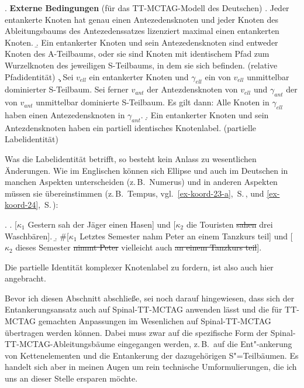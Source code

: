 \ex. {\bf Externe Bedingungen} (für das TT-MCTAG-Modell des Deutschen)
\a. Jeder entankerte Knoten hat genau einen Antezedensknoten und jeder Knoten des Ableitungsbaums des Antezedenssatzes lizenziert maximal einen entankerten Knoten.
\b. Ein entankerter Knoten und sein Antezedensknoten sind entweder Knoten des A-Teilbaums, oder sie sind Knoten mit identischem Pfad zum Wurzelknoten des jeweiligen S-Teilbaums, in dem sie sich befinden. (relative Pfadidentität) 
\c. Sei $v_{\mathit{ell}}$ ein entankerter Knoten und $\gamma_{\mathit{ell}}$ ein von $v_{\mathit{ell}}$ unmittelbar dominierter S-Teilbaum. Sei ferner $v_{\mathit{ant}}$ der Antezdensknoten von $v_{\mathit{ell}}$ und $\gamma_{\mathit{ant}}$ der von $v_{\mathit{ant}}$ unmittelbar dominierte S-Teilbaum. Es gilt dann: Alle Knoten in $\gamma_{\mathit{ell}}$ haben einen Antezedensknoten in $\gamma_{\mathit{ant}}$. 
\d. Ein entankerter Knoten und sein Antezdensknoten haben ein partiell identisches Knotenlabel. (partielle Labelidentität)   
 
Was die Labelidentität betrifft, so besteht kein Anlass zu wesentlichen Änderungen. Wie im Englischen können sich Ellipse und  auch im Deutschen in manchen Aspekten unterscheiden (z.\,B.\ Numerus) und in anderen Aspekten müssen sie übereinstimmen (z.\,B.\ Tempus, vgl.\ \ref{ex-koord-23-a},~S.\,\pageref{ex-koord-23-a}, und \ref{ex-koord-24},~S.\,\pageref{ex-koord-24}):

\ex. 
\a. [$\kappa_1$ Gestern sah der Jäger einen Hasen] und [$\kappa_2$ die Touristen \sout{sahen} drei Waschbären].\label{ex-koord-23-a-wdh}
\b. \#[$\kappa_1$ Letztes Semester nahm Peter an einem Tanzkurs teil] und [$\kappa_2$ dieses Semester \sout{nimmt Peter} vielleicht auch \sout{an einem Tanzkurs teil}].\label{ex-koord-24-wdh}

Die partielle Identität komplexer Knotenlabel zu fordern, ist also auch hier angebracht.  %

Bevor ich diesen Abschnitt abschlie\ss e, sei noch darauf hingewiesen, dass sich der Entankerungsansatz auch auf Spinal-TT-MCTAG anwenden lässt und die für TT-MCTAG gemachten Anpassungen im Wesenlichen auf Spinal-TT-MCTAG übertragen werden können. Dabei muss zwar auf die spezifische Form der Spinal-TT-MCTAG-Ableitungsbäume eingegangen werden, z.\,B.\ auf die Ent"-ankerung von Kettenelementen und die Entankerung der dazugehörigen S"=Teilbäumen. Es handelt sich aber in meinen Augen um rein technische Umformulierungen, die ich uns an dieser Stelle ersparen möchte. \\


